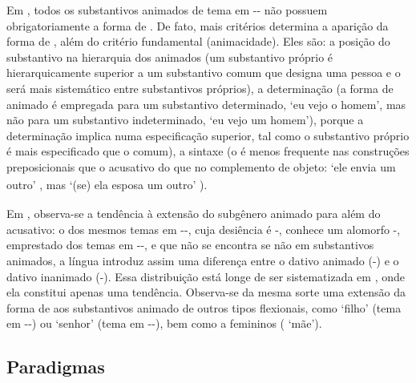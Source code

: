 Em , todos os substantivos animados de tema em
-- não possuem obrigatoriamente a forma de . De fato,
mais critérios determina a aparição da forma de , além do
critério fundamental (animacidade).
Eles são: a posição do substantivo na hierarquia dos animados (um substantivo próprio é
hierarquicamente superior a um substantivo comum que designa uma pessoa e o
 será mais sistemático entre substantivos próprios), a
determinação (a forma de animado é empregada para um substantivo determinado,
 `eu vejo o homem', mas não para um substantivo
indeterminado,  `eu vejo um homem'), porque a determinação
implica numa especificação superior, tal como o substantivo próprio é mais
especificado que o comum), a sintaxe (o  é menos frequente nas
construções preposicionais que o acusativo do que no complemento de objeto:
 \textsubscript{} `ele envia um
outro' , mas \textsubscript{} `(se) ela esposa um outro' ).

Em , observa-se a tendência à extensão do subgênero
animado para além do acusativo: o  dos mesmos temas em
--, cuja desiência é -, conhece um alomorfo -,
emprestado dos temas em --, e que não se encontra se não em
substantivos animados, a língua introduz assim uma diferença entre o dativo
animado (-) e o dativo inanimado (-).
Essa distribuição está longe de ser sistematizada em ,
onde ela constitui apenas uma tendência.
Observa-se da mesma sorte uma extensão da forma de  aos
substantivos animado de outros tipos flexionais, como  `filho'
(tema em --) ou  `senhor' (tema em --),
bem como a femininos ( `mãe').


\subsection{Paradigmas}

